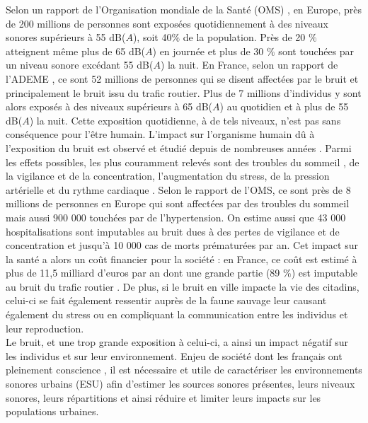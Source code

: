 Selon un rapport de l'Organisation mondiale de la Santé (OMS) \cite{who_burden_2017}, en Europe, près de 200 millions de personnes sont exposées quotidiennement à des niveaux sonores supérieurs à 55 dB($A$), soit 40$\%$ de la population. Près de 20 $\%$ atteignent même plus de 65 dB($A$) en journée et plus de 30 $\%$ sont touchées par un niveau sonore excédant 55 dB($A$) la nuit. En France, selon un rapport de l'ADEME \cite{europeens2016analyse}, ce sont 52 millions de personnes qui se disent affectées par le bruit et principalement le bruit issu du trafic routier. Plus de 7 millions d'individus y sont alors exposés à des niveaux supérieurs à 65 dB($A$) au quotidien et à plus de 55 dB($A$) la nuit.
Cette exposition quotidienne, à de tels niveaux, n'est pas sans conséquence pour l'être humain. L'impact sur l'organisme humain dû à l'exposition du bruit est observé et étudié depuis de nombreuses années \cite{ising1980health}. Parmi les effets possibles, les plus couramment relevés sont des troubles du sommeil \cite{pirrera2010nocturnal}, de la vigilance et de la concentration, l'augmentation du stress, de la pression artérielle et du rythme cardiaque \cite{babisch2008road, babisch2005traffic}. Selon le rapport de l'OMS, ce sont près de 8 millions de personnes en Europe qui sont affectées par des troubles du sommeil mais aussi 900 000 touchées par de l'hypertension. On estime aussi que 43 000 hospitalisations sont imputables au bruit dues à des pertes de vigilance et de concentration et jusqu'à 10 000 cas de morts prématurées par an. Cet impact sur la santé a alors un coût financier pour la société : en France, ce coût est estimé à plus de 11,5 milliard d'euros par an dont une grande partie (89 $\%$) est imputable au bruit du trafic routier \cite{europeens2016analyse}. De plus, si le bruit en ville impacte la vie des citadins, celui-ci se fait également ressentir auprès de la faune sauvage \cite{dutilleux_anthropogenic_2012, francis2009noise} leur causant également du stress ou en compliquant la communication entre les individus et leur reproduction.\\

Le bruit, et une trop grande exposition à celui-ci, a ainsi un impact négatif sur les individus et sur leur environnement. Enjeu de société dont les français ont pleinement conscience \cite{JNA2016etude}, il est nécessaire et utile de caractériser les environnements sonores urbains (ESU) afin d'estimer les sources sonores présentes, leurs niveaux sonores, leurs répartitions et ainsi réduire et limiter leurs impacts sur les populations urbaines.


